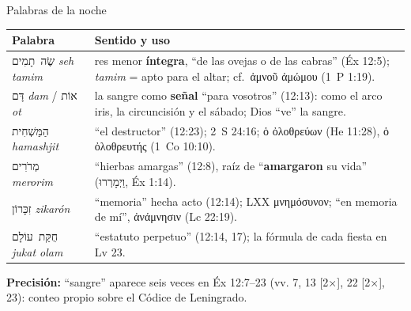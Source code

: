 \documentclass[hyperref={bookmarks=false},aspectratio=169]{beamer}
\newcommand{\heb}[1]{\mbox{\foreignlanguage{hebrew}{#1}}}
\newcommand{\grc}[1]{\foreignlanguage{ancientgreek}{#1}}
\newcommand{\destacar}[1]{\textbf{\textcolor{tierraroja}{#1}}}
\newcommand{\precision}[1]{{\footnotesize\color{sepia}\textbf{Precisión:} #1}}
\begin{document}
\begin{frame}{Palabras de la noche}
\scriptsize\renewcommand{\arraystretch}{1.16}
\begin{tabular}{@{}L{2.9cm}L{9.2cm}@{}}
\toprule
\textbf{Palabra} & \textbf{Sentido y uso} \\ \midrule
\heb{שֶׂה תָמִים} \emph{seh tamim} & res menor \destacar{íntegra}, ``de las ovejas o de las cabras'' (Éx 12:5); \emph{tamim} = apto para el altar; cf.\ \grc{ἀμνοῦ ἀμώμου} (1~P 1:19). \\
\heb{דָּם} \emph{dam} / \heb{אוֹת} \emph{ot} & la sangre como \destacar{señal} ``para vosotros'' (12:13): como el arco iris, la circuncisión y el sábado; Dios ``ve'' la sangre. \\
\heb{הַמַּשְׁחִית} \emph{hamashjit} & ``el destructor'' (12:23); 2~S 24:16; \grc{ὁ ὀλοθρεύων} (He 11:28), \grc{ὁ ὀλοθρευτής} (1~Co 10:10). \\
\heb{מְרֹרִים} \emph{merorim} & ``hierbas amargas'' (12:8), raíz de ``\destacar{amargaron} su vida'' (\heb{וַיְמָרְרוּ}, Éx 1:14). \\
\heb{זִכָּרוֹן} \emph{zikarón} & ``memoria'' hecha acto (12:14); LXX \grc{μνημόσυνον}; ``en memoria de mí'', \grc{ἀνάμνησιν} (Lc 22:19). \\
\heb{חֻקַּת עוֹלָם} \emph{jukat olam} & ``estatuto perpetuo'' (12:14, 17); la fórmula de cada fiesta en Lv 23. \\
\bottomrule
\end{tabular}\par\smallskip
\precision{``sangre'' aparece seis veces en Éx 12:7--23 (vv. 7, 13 [2×], 22 [2×], 23): conteo propio sobre el Códice de Leningrado.}
\end{frame}
\end{document}
